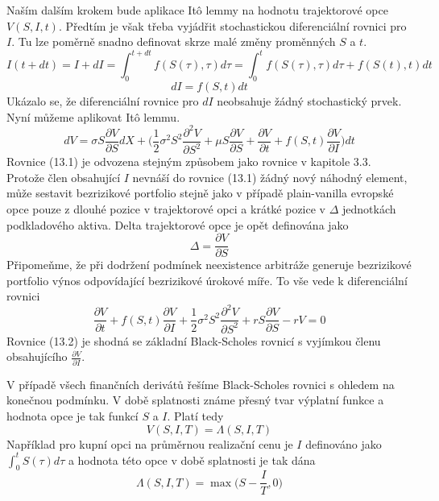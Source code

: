 \documentclass[a4paper]{book}
\begin{document}
Naším dalším krokem bude aplikace It\^o lemmy na hodnotu trajektorové opce $V(S,I,t)$. Předtím je však třeba vyjádřit stochastickou diferenciální rovnici pro $I$. Tu lze poměrně snadno definovat skrze malé změny proměnných $S$ a $t$.
\begin{equation*}
I(t + dt) = I + dI = \int_0^{t + dt} f(S(\tau), \tau) d \tau = \int_0^t f(S(\tau), \tau) d \tau + f(S(t),t) dt
\end{equation*}
\begin{equation*}
dI = f(S,t)dt
\end{equation*}
Ukázalo se, že diferenciální rovnice pro $dI$ neobsahuje žádný stochastický prvek. Nyní můžeme aplikovat It\^o lemmu.
\begin{equation}
dV = \sigma S \frac{\partial V}{\partial S} dX + \Big( \frac{1}{2} \sigma^2 S^2 \frac{\partial^2 V}{\partial S^2} + \mu S \frac{\partial V}{\partial S} + \frac{\partial V}{\partial t} + f(S,t)\frac{\partial V}{\partial I} \Big) dt
\end{equation}
Rovnice (13.1) je odvozena stejným způsobem jako rovnice v kapitole 3.3. Protože člen obsahující $I$ nevnáší do rovnice  (13.1) žádný nový náhodný element, může sestavit bezrizikové portfolio stejně jako v případě plain-vanilla evropské opce pouze z dlouhé pozice v trajektorové opci a krátké pozice v $\Delta$ jednotkách podkladového aktiva. Delta trajektorové opce je opět definována jako
\begin{equation*}
\Delta = \frac{\partial V}{\partial S}
\end{equation*}
Připomeňme, že při dodržení podmínek neexistence arbitráže generuje bezrizikové portfolio výnos odpovídající bezrizikové úrokové míře. To vše vede k diferenciální rovnici
\begin{equation}
\frac{\partial V}{\partial t} + f(S,t) \frac{\partial V}{\partial I} + \frac{1}{2} \sigma^2 S^2 \frac{\partial^2 V}{\partial S^2} + r S \frac{\partial V}{\partial S} - rV = 0
\end{equation}
Rovnice (13.2) je shodná se základní Black-Scholes rovnicí s vyjímkou členu obsahujícího $\frac{\partial V}{\partial I}$.

V případě všech finančních derivátů řešíme Black-Scholes rovnici s ohledem na konečnou podmínku. V době splatnosti známe přesný tvar výplatní funkce a hodnota opce je tak funkcí $S$ a $I$. Platí tedy
\begin{equation*}
V(S,I,T) = \Lambda(S,I,T)
\end{equation*}
Například pro kupní opci na průměrnou realizační cenu je $I$ definováno jako $\int_0^tS(\tau) d \tau$ a hodnota této opce v době splatnosti je tak dána
\begin{equation*}
\Lambda(S,I,T) = \max \Big( S - \frac{I}{T}, 0 \Big)
\end{equation*}
\end{document}
